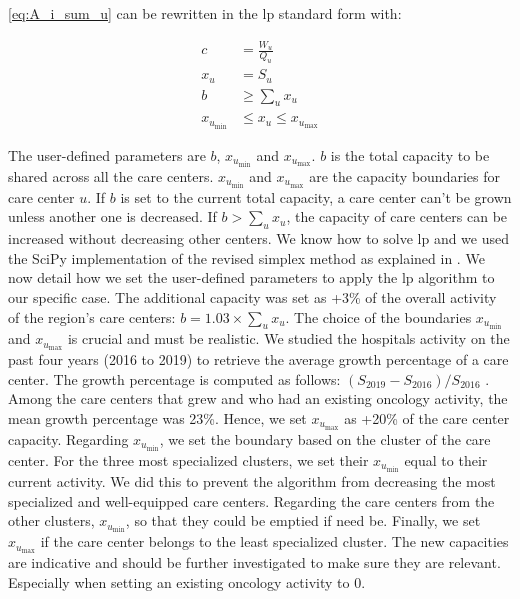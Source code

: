 \cref{eq:A_i_sum_u} can be rewritten in the \ac{lp} standard form with:

\begin{align*}
    c                & = \frac{W_u}{Q_u}              \\
    x_u              & = S_u                          \\
    b                & \geq \sum_{u} x_u              \\
    x_{u_\text{min}} & \leq x_u \leq x_{u_\text{max}}
\end{align*}

The user-defined parameters are $b$, $x_{u_\text{min}}$ and $x_{u_\text{max}}$.
$b$ is the total capacity to be shared across all the care centers.
$x_{u_\text{min}}$ and $x_{u_\text{max}}$ are the capacity boundaries for care
center $u$. If $b$ is set to the current total capacity, a care center can’t be
grown unless another one is decreased. If $b > \sum_{u} x_u$, the capacity of
care centers can be increased without decreasing other centers. We know how to
solve \ac{lp} and we used the SciPy \cite{virtanen_scipy_2020} implementation of
the revised simplex method as explained in \cite{bertsimas_introduction_1998}.
We now detail how we set the user-defined parameters to apply the \ac{lp}
algorithm to our specific case. The additional capacity was set as +3\% of the
overall activity of the region's care centers: $b = 1.03 \times \sum_{u} x_u$.
The choice of the boundaries $x_{u_\text{min}}$  and $x_{u_\text{max}}$ is
crucial and must be realistic. We studied the hospitals activity on the past
four years (2016 to 2019) to retrieve the average growth percentage of a care
center. The growth percentage is computed as follows: $(S_\text{2019} -
    S_\text{2016}) / S_\text{2016}$ . Among the care centers that grew and who had
an existing oncology activity, the mean growth percentage was 23\%. Hence, we
set $x_{u_\text{max}}$ as +20\% of the care center capacity. Regarding
$x_{u_\text{min}}$, we set the boundary based on the cluster of the care center.
For the three most specialized clusters, we set their $x_{u_\text{min}}$ equal
to their current activity. We did this to prevent the algorithm from decreasing
the most specialized and well-equipped care centers. Regarding the care centers
from the other clusters, $x_{u_\text{min}}$, so that they could be emptied if
need be. Finally, we set $x_{u_\text{max}}$ if the care center belongs to the
least specialized cluster. The new capacities are indicative and should be
further investigated to make sure they are relevant. Especially when setting an
existing oncology activity to 0.

